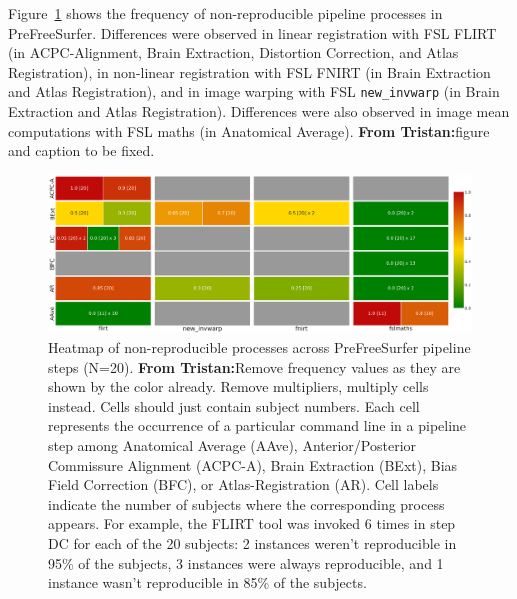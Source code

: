 \documentclass[a4paper,num-refs]{oup-contemporary}
\newcommand{\tristan}[1]{\color{blue}\textbf{From Tristan:}#1\color{black}}
\begin{document}
Figure~\ref{fig:pfs_freq} shows the frequency of non-reproducible pipeline processes
in PreFreeSurfer. 
Differences were observed in linear registration 
with FSL FLIRT (in ACPC-Alignment, Brain Extraction, Distortion Correction, and
Atlas Registration), in non-linear registration with FSL FNIRT (in Brain Extraction 
and Atlas Registration), and in image warping with FSL \texttt{new\_invwarp} (in Brain Extraction 
and Atlas Registration). Differences were also observed in image mean 
computations with FSL maths  (in Anatomical Average). \tristan{figure and caption to be fixed.} 




\begin{figure}
\centering
  \includegraphics[width=\textwidth]{images/pfs_heatmap.png}
  \caption{Heatmap of non-reproducible processes across PreFreeSurfer pipeline steps (N=20). 
  \tristan{Remove frequency values as they are shown by the color already. Remove multipliers, multiply cells instead. Cells should just contain subject numbers.}
  Each cell represents the occurrence of a particular command line in a
  pipeline step among Anatomical Average (AAve), Anterior/Posterior
  Commissure Alignment (ACPC-A), Brain Extraction (BExt), Bias Field
  Correction (BFC), or Atlas-Registration (AR). Cell labels indicate the
  number of subjects where the corresponding process appears. For example,
  the FLIRT tool was invoked 6 times in step DC for each of the 20
  subjects: 2 instances weren't reproducible in 95\% of the subjects, 3
  instances were always reproducible, and 1 instance wasn't reproducible in
  85\% of the subjects.
        }
  \label{fig:pfs_freq}
\end{figure}
\end{document}

